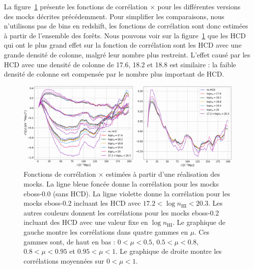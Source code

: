 La figure~\ref{fig:cf_nhi_bins} présente les fonctions de corrélation \lya{}$\times$\lya{} pour les différentes versions des mocks décrites précédemment. Pour simplifier les comparaisons, nous n'utilisons pas de bins en redshift, les fonctions de corrélation sont donc estimées à partir de l'ensemble des forêts.
Nous pouvons voir sur la figure~\ref{fig:cf_nhi_bins} que les HCD qui ont le plus grand effet sur la fonction de corrélation sont les HCD avec une grande densité de colonne, malgré leur nombre plus restreint. L'effet causé par les HCD avec une densité de colonne de \num{17.6}, \num{18.2} et \num{18.8} est similaire : la faible densité de colonne est compensée par le nombre plus important de HCD.

\begin{figure}
  \centering
  \includegraphics[scale=0.35]{cf_nhi_bins}
  \caption{Fonctions de corrélation \lya{}$\times$\lya{} estimées à partir d'une réalisation des mocks.
    La ligne bleue foncée donne la corrélation pour les mocks eboss-0.0 (sans HCD). La ligne violette donne la corrélation pour les mocks eboss-0.2 incluant les HCD avec $\num{17.2} < \log n_{\mathrm{HI}} < \num{20.3}$. Les autres couleurs donnent les corrélations pour les mocks eboss-0.2 incluant des HCD avec une valeur fixe en $\log n_{\mathrm{HI}}$.
    Le graphique de gauche montre les corrélations dans quatre gammes en $\mu$. Ces gammes sont, de haut en bas : $\num{0}<\mu<\num{0.5}$, $\num{0.5}<\mu<\num{0.8}$, $\num{0.8}<\mu<\num{0.95}$ et $\num{0.95}<\mu<\num{1}$. Le graphique de droite montre les corrélations moyennées sur $\num{0} < \mu < \num{1}$.}
  \label{fig:cf_nhi_bins}
\end{figure}

